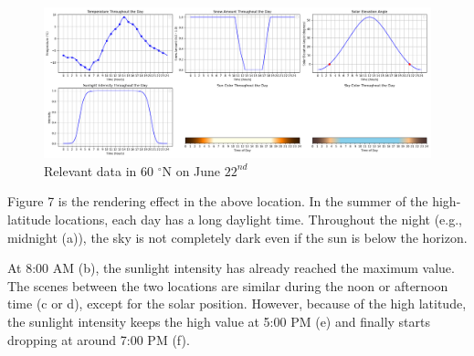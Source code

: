 \documentclass{article}
\begin{document}
\begin{figure}[h]
  \centering
  \begin{minipage}{1.00\textwidth}
      \centering
      \includegraphics[width=\textwidth]{images/Plot60S.png}
      \caption{Relevant data in 60 $^{\circ}$N on June \(22^{nd}\)}
      \label{fig:Plot60S}
  \end{minipage}
\end{figure}

Figure 7 is the rendering effect in the above location. In the summer of the high-latitude locations, each day has a long daylight 
time. Throughout the night (e.g., midnight (a)), the sky is not completely dark even if the sun is below the horizon. 

At 8:00 AM (b), the sunlight intensity has already reached the maximum value. The scenes between the two locations are similar during 
the noon or afternoon time (c or d), except for the solar position. However, because of the high latitude, the sunlight intensity 
keeps the high value at 5:00 PM (e) and finally starts dropping at around 7:00 PM (f).
\end{document}

